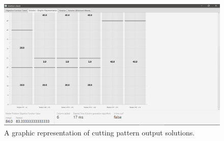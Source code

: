 \documentclass[10pt,a4paper]{article}
\begin{document}
\begin{figure}[H]
\includegraphics[width=\textwidth]{./images/solgraphic.png}
\centering
\caption{A graphic representation of cutting pattern output solutions.}

\end{figure}
\end{document}
